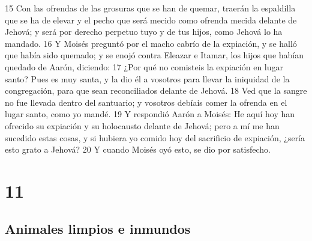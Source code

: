 15 Con las ofrendas de las grosuras que se han de quemar, traerán la espaldilla que se ha de elevar y el pecho que será mecido como ofrenda mecida delante de Jehová; y será por derecho perpetuo tuyo y de tus hijos, como Jehová lo ha mandado.
16 Y Moisés preguntó por el macho cabrío de la expiación, y se halló que había sido quemado; y se enojó contra Eleazar e Itamar, los hijos que habían quedado de Aarón, diciendo:
17 ¿Por qué no comisteis la expiación en lugar santo? Pues es muy santa, y la dio él a vosotros para llevar la iniquidad de la congregación, para que sean reconciliados delante de Jehová.
18 Ved que la sangre no fue llevada dentro del santuario; y vosotros debíais comer la ofrenda en el lugar santo, como yo mandé.
19 Y respondió Aarón a Moisés: He aquí hoy han ofrecido su expiación y su holocausto delante de Jehová; pero a mí me han sucedido estas cosas, y si hubiera yo comido hoy del sacrificio de expiación, ¿sería esto grato a Jehová?
20 Y cuando Moisés oyó esto, se dio por satisfecho.

\chapter{11}

\section*{Animales limpios e inmundos}

